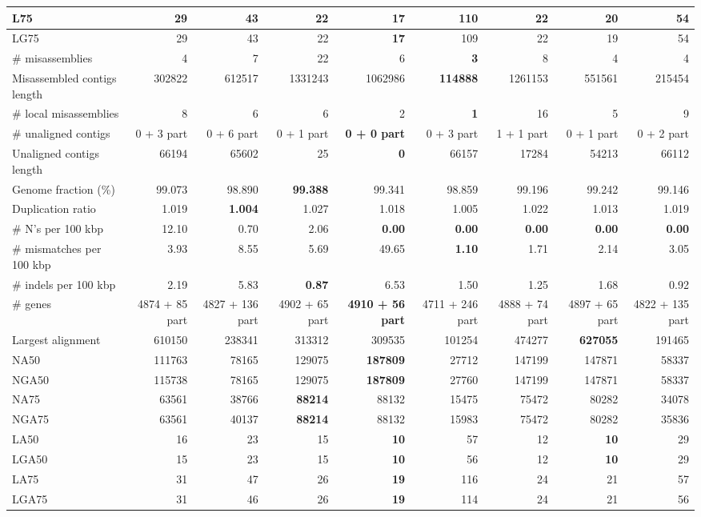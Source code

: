 \documentclass[12pt,a4paper]{article}
\begin{document}
\begin{table}[ht]
\begin{center}
\begin{tabular}{|l*{8}{|r}|}
L75 & 29 & 43 & 22 & {\bf 17} & 110 & 22 & 20 & 54 \\ \hline
LG75 & 29 & 43 & 22 & {\bf 17} & 109 & 22 & 19 & 54 \\ \hline
\# misassemblies & 4 & 7 & 22 & 6 & {\bf 3} & 8 & 4 & 4 \\ \hline
Misassembled contigs length & 302822 & 612517 & 1331243 & 1062986 & {\bf 114888} & 1261153 & 551561 & 215454 \\ \hline
\# local misassemblies & 8 & 6 & 6 & 2 & {\bf 1} & 16 & 5 & 9 \\ \hline
\# unaligned contigs & 0 + 3 part & 0 + 6 part & 0 + 1 part & {\bf 0 + 0 part} & 0 + 3 part & 1 + 1 part & 0 + 1 part & 0 + 2 part \\ \hline
Unaligned contigs length & 66194 & 65602 & 25 & {\bf 0} & 66157 & 17284 & 54213 & 66112 \\ \hline
Genome fraction (\%) & 99.073 & 98.890 & {\bf 99.388} & 99.341 & 98.859 & 99.196 & 99.242 & 99.146 \\ \hline
Duplication ratio & 1.019 & {\bf 1.004} & 1.027 & 1.018 & 1.005 & 1.022 & 1.013 & 1.019 \\ \hline
\# N's per 100 kbp & 12.10 & 0.70 & 2.06 & {\bf 0.00} & {\bf 0.00} & {\bf 0.00} & {\bf 0.00} & {\bf 0.00} \\ \hline
\# mismatches per 100 kbp & 3.93 & 8.55 & 5.69 & 49.65 & {\bf 1.10} & 1.71 & 2.14 & 3.05 \\ \hline
\# indels per 100 kbp & 2.19 & 5.83 & {\bf 0.87} & 6.53 & 1.50 & 1.25 & 1.68 & 0.92 \\ \hline
\# genes & 4874 + 85 part & 4827 + 136 part & 4902 + 65 part & {\bf 4910 + 56 part} & 4711 + 246 part & 4888 + 74 part & 4897 + 65 part & 4822 + 135 part \\ \hline
Largest alignment & 610150 & 238341 & 313312 & 309535 & 101254 & 474277 & {\bf 627055} & 191465 \\ \hline
NA50 & 111763 & 78165 & 129075 & {\bf 187809} & 27712 & 147199 & 147871 & 58337 \\ \hline
NGA50 & 115738 & 78165 & 129075 & {\bf 187809} & 27760 & 147199 & 147871 & 58337 \\ \hline
NA75 & 63561 & 38766 & {\bf 88214} & 88132 & 15475 & 75472 & 80282 & 34078 \\ \hline
NGA75 & 63561 & 40137 & {\bf 88214} & 88132 & 15983 & 75472 & 80282 & 35836 \\ \hline
LA50 & 16 & 23 & 15 & {\bf 10} & 57 & 12 & {\bf 10} & 29 \\ \hline
LGA50 & 15 & 23 & 15 & {\bf 10} & 56 & 12 & {\bf 10} & 29 \\ \hline
LA75 & 31 & 47 & 26 & {\bf 19} & 116 & 24 & 21 & 57 \\ \hline
LGA75 & 31 & 46 & 26 & {\bf 19} & 114 & 24 & 21 & 56 \\ \hline
\end{tabular}
\end{center}
\end{table}
\end{document}
